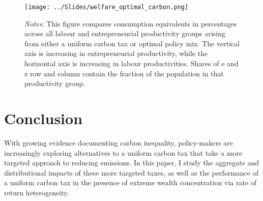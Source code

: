 \documentclass[12pt,a4paper]{article}
\begin{document}
\begin{figure}[h! tbp]
\begin{center}
\centering
{}

\texttt{[image: ../Slides/welfare\_optimal\_carbon.png]}
\captionsetup{font=footnotesize}
\caption*{\textit{Notes:} This figure compares consumption equivalents in percentages across all labour and entrepreneurial productivity groups arising from either a uniform carbon tax or optimal policy mix. The vertical axis is increasing in entrepreneurial productivity, while the horizontal axis is increasing in labour productivities. Shares of e and z row and column contain the fraction of the population in that productivity group. }
     \label{fig:welf_breakdown}
\end{center}
\end{figure}

\section{Conclusion}
\hspace*{6mm} With growing evidence documenting carbon inequality, policy-makers are increasingly exploring alternatives to a uniform carbon tax that take a more targeted approach to reducing emissions. In this paper, I study the aggregate and distributional impacts of these more targeted taxes, as well as the performance of a uniform carbon tax in the presence of extreme wealth concentration via rate of return heterogeneity. 
\end{document}
